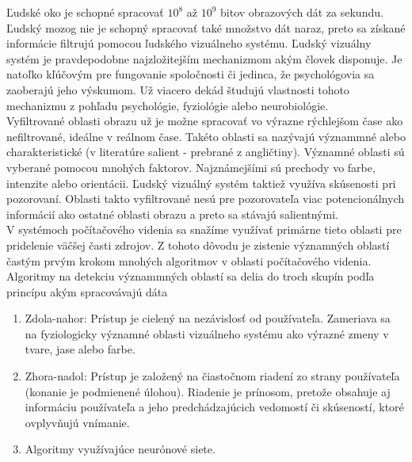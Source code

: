 
Ľudské oko je schopné spracovať \begin{math}10^8\end{math} až \begin{math}10^9\end{math} bitov obrazových dát za sekundu.
Ľudský mozog nie je schopný spracovať také množstvo dát naraz, preto sa získané informácie filtrujú pomocou ľudského vizuálneho systému\cite{Fmph-videnie}.
Ľudský vizuálny systém je pravdepodobne najzložitejším mechanizmom akým človek disponuje.
Je natoľko kľúčovým pre fungovanie spoločnosti či jedinca, že psychológovia sa zaoberajú jeho výskumom.
Už viacero dekád študujú vlastnosti tohoto mechanizmu z pohľadu psychológie, fyziológie alebo neurobiológie.
\\
Vyfiltrované oblasti obrazu už je možne spracovať vo výrazne rýchlejšom čase ako nefiltrované, ideálne v reálnom čase.
Takéto oblasti sa nazývajú význammné alebo charakteristické (v literatúre salient - prebrané z angličtiny).
Významné oblasti sú vyberané pomocou mnohých faktorov.
Najznámejšími sú prechody vo farbe, intenzite alebo orientácii.
Ľudský vizuálný systém taktiež využíva skúsenosti pri pozorovaní.
Oblasti takto vyfiltrované nesú pre pozorovateľa viac potencionálnych informácií ako ostatné oblasti obrazu a preto sa stávajú salientnými.
\\
V systémoch počítačového videnia sa snažíme využívať primárne tieto oblasti pre pridelenie väčšej časti zdrojov.
Z tohoto dôvodu je zistenie významných oblastí častým prvým krokom mnohých algoritmov v oblasti počítačového videnia.
\\
Algoritmy na detekciu význammných oblastí sa delia do troch skupín podľa princípu akým spracovávajú dáta\cite{brief-survey}

  \begin{enumerate}
          \item Zdola-nahor: Prístup je cielený na nezávislosť od používateľa.
          Zameriava sa na fyziologicky významné oblasti vizuálneho systému ako výrazné zmeny v tvare, jase alebo farbe.
          \item Zhora-nadol: Prístup je založený na čiastočnom riadení zo strany používateľa (konanie je podmienené úlohou).
          Riadenie je prínosom, pretože obsahuje aj informáciu používateľa a jeho predchádzajúcich vedomostí či skúseností, ktoré ovplyvňujú vnímanie.
          \item Algoritmy využívajúce neurónové siete.
  \end{enumerate}

